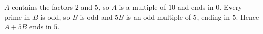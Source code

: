 $A$ contains the factors $2$ and $5$, so $A$ is a multiple of $10$ and ends in $0$. Every prime in $B$ is odd, so $B$ is odd and $5B$ is an odd multiple of $5$, ending in $5$. Hence $A+5B$ ends in $\boxed{5}$.

